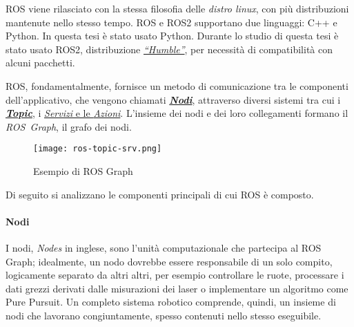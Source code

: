 ROS viene rilasciato con la stessa filosofia delle \textit{distro linux}, con più distribuzioni mantenute
nello stesso tempo. ROS e ROS2 \cite{ros-diff} supportano due linguaggi: C++ e Python. In questa tesi è stato usato
Python. Durante lo studio di questa tesi è stato usato ROS2, distribuzione
\href{https://docs.ros.org/en/humble/}{\textit{``Humble''}}, per necessità di compatibilità con alcuni
pacchetti.

\bigskip
\noindent ROS, fondamentalmente, fornisce un metodo di comunicazione tra le componenti dell'applicativo,
che vengono chiamati \hyperref[ros:nodes]{\textbf{\textit{Nodi}}}, attraverso diversi sistemi tra cui i
\hyperref[ros:topics]{\textbf{\textit{Topic}}}, i \hyperref[ros:srv-act]{\textit{Servizi} e le
\textit{Azioni}}. L'insieme dei nodi e dei loro collegamenti formano il \textit{ROS~Graph}, il grafo dei
nodi.

\medskip
\begin{figure}[h]
	\centering
	\texttt{[image: ros-topic-srv.png]}
	\caption{Esempio di ROS Graph \cite{lection01}}
	\label{fig:ros-topic-srv}
\end{figure}
\noindent Di seguito si analizzano le componenti principali di cui ROS è composto.
\paragraph{Nodi \cite{undr-nodes, ros-nodes}} 
\label{ros:nodes}
I nodi, \textit{Nodes} in inglese, sono l'unità computazionale che partecipa al ROS Graph; idealmente, un
nodo dovrebbe essere responsabile di un solo compito, logicamente separato da altri altri, per esempio
controllare le ruote, processare i dati grezzi derivati dalle misurazioni dei laser o implementare un
algoritmo come Pure Pursuit.
Un completo sistema robotico comprende, quindi, un insieme di nodi che lavorano congiuntamente, spesso
contenuti nello stesso eseguibile.\\

